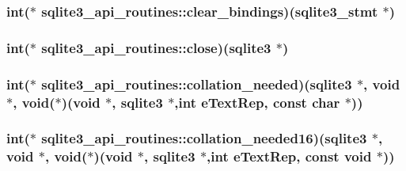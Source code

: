 \hypertarget{structsqlite3__api__routines_a6154fab4f9101c9ababb806dac91d01f}{
\subsubsection[{clear\-\_\-bindings}]{\setlength{\rightskip}{0pt plus 5cm}int($\ast$ sqlite3\-\_\-api\-\_\-routines\-::clear\-\_\-bindings)({\bf sqlite3\-\_\-stmt} $\ast$)}}\label{structsqlite3__api__routines_a6154fab4f9101c9ababb806dac91d01f}
\hypertarget{structsqlite3__api__routines_a26f93f921a5f6709be46902616ca8bcf}{
\subsubsection[{close}]{\setlength{\rightskip}{0pt plus 5cm}int($\ast$ sqlite3\-\_\-api\-\_\-routines\-::close)({\bf sqlite3} $\ast$)}}\label{structsqlite3__api__routines_a26f93f921a5f6709be46902616ca8bcf}
\hypertarget{structsqlite3__api__routines_a569a60dc0628b75c5cb20edb73d40ab4}{
\subsubsection[{collation\-\_\-needed}]{\setlength{\rightskip}{0pt plus 5cm}int($\ast$ sqlite3\-\_\-api\-\_\-routines\-::collation\-\_\-needed)({\bf sqlite3} $\ast$, void $\ast$, void($\ast$)(void $\ast$, {\bf sqlite3} $\ast$,int e\-Text\-Rep, const char $\ast$))}}\label{structsqlite3__api__routines_a569a60dc0628b75c5cb20edb73d40ab4}
\hypertarget{structsqlite3__api__routines_a8c4e7afdf70af85fc133adfc1ddb8401}{
\subsubsection[{collation\-\_\-needed16}]{\setlength{\rightskip}{0pt plus 5cm}int($\ast$ sqlite3\-\_\-api\-\_\-routines\-::collation\-\_\-needed16)({\bf sqlite3} $\ast$, void $\ast$, void($\ast$)(void $\ast$, {\bf sqlite3} $\ast$,int e\-Text\-Rep, const void $\ast$))}}\label{structsqlite3__api__routines_a8c4e7afdf70af85fc133adfc1ddb8401}
